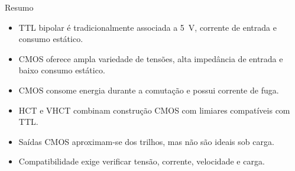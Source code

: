 \begin{frame}{Resumo}
    \begin{itemize}
        \item TTL bipolar é tradicionalmente associada a 5~V, corrente
              de entrada e consumo estático.
        \item CMOS oferece ampla variedade de tensões, alta impedância de entrada
              e baixo consumo estático.
        \item CMOS consome energia durante a comutação e possui corrente de fuga.
        \item HCT e VHCT combinam construção CMOS com limiares compatíveis com TTL.
        \item Saídas CMOS aproximam-se dos trilhos, mas não são ideais sob carga.
        \item Compatibilidade exige verificar tensão, corrente, velocidade e carga.
    \end{itemize}
\end{frame}